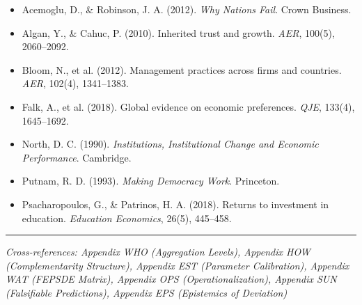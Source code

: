 \begin{itemize}[nosep]
    \item Acemoglu, D., \& Robinson, J. A. (2012). \textit{Why Nations Fail}. Crown Business.
    \item Algan, Y., \& Cahuc, P. (2010). Inherited trust and growth. \textit{AER}, 100(5), 2060--2092.
    \item Bloom, N., et al. (2012). Management practices across firms and countries. \textit{AER}, 102(4), 1341--1383.
    \item Falk, A., et al. (2018). Global evidence on economic preferences. \textit{QJE}, 133(4), 1645--1692.
    \item North, D. C. (1990). \textit{Institutions, Institutional Change and Economic Performance}. Cambridge.
    \item Putnam, R. D. (1993). \textit{Making Democracy Work}. Princeton.
    \item Psacharopoulos, G., \& Patrinos, H. A. (2018). Returns to investment in education. \textit{Education Economics}, 26(5), 445--458.
\end{itemize}

\vspace{1em}
\hrule
\vspace{0.5em}
\noindent\textit{Cross-references: Appendix WHO (Aggregation Levels), 
Appendix HOW (Complementarity Structure), Appendix EST (Parameter Calibration),
Appendix WAT (FEPSDE Matrix), Appendix OPS (Operationalization), 
Appendix SUN (Falsifiable Predictions), Appendix EPS (Epistemics of Deviation)}

